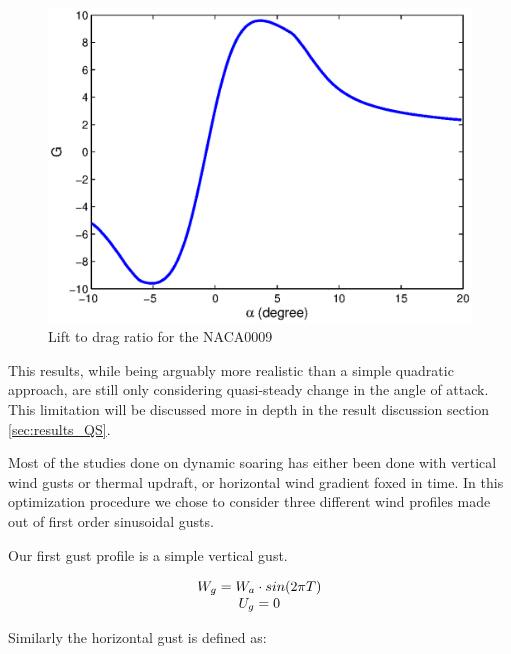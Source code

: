 \begin{figure}[ht]
\begin{center}
   \includegraphics{./Figures/NACA0009_steady_map_G.eps}
\end{center}
\caption{Lift to drag ratio for the NACA0009}
\label{fig:G_vs_alpha_qs}
\end{figure}

\par This results, while being arguably more realistic than a simple quadratic approach, are still only considering quasi-steady change in the angle of attack.
This limitation will be discussed more in depth in the result discussion section \ref{sec:results_QS}.

\FloatBarrier
{}
Most of the studies done on dynamic soaring has either been done with vertical wind gusts or thermal updraft, or horizontal wind gradient foxed in time.
In this optimization procedure we chose to consider three different wind profiles made out of first order sinusoidal gusts.

\par Our first gust profile is a simple vertical gust.

\begin{equation}
\begin{array}[c]{c}
  W_g = W_a \cdot sin(2\pi T) \\
  U_g = 0 
\end{array}
\label{eqn:vertical_gust_definition}
\end{equation}

\par Similarly the horizontal gust is defined as:

